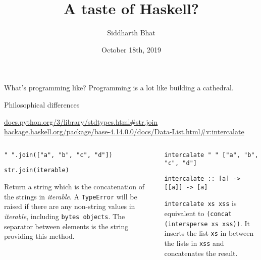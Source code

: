 \documentclass[8pt]{beamer}
\author{Siddharth Bhat}
\date{October 18th, 2019}
\institute{IIIT Open Source Developers group}
\title{A taste of Haskell?}
\begin{document}
\maketitle

\begin{frame}[fragile]{What's programming like?}
    Programming is a lot like building a cathedral.
\end{frame}

\begin{frame}[fragile]{Philosophical differences}

{\tiny \url{docs.python.org/3/library/stdtypes.html#str.join}}
{\tiny \url{hackage.haskell.org/package/base-4.14.0.0/docs/Data-List.html#v:intercalate}}

\begin{columns}%
\begin{column}{.48\textwidth}
\begin{verbatim}
" ".join(["a", "b", "c", "d"])
\end{verbatim}
\begin{verbatim}
str.join(iterable)
\end{verbatim}

Return a string which is the concatenation of the strings in \emph{iterable}. A
\verb|TypeError| will be raised if there are any non-string values in \emph{iterable},
including \verb|bytes objects|. The separator between elements is the string providing
this method.


\end{column}
%
\begin{column}{.48\textwidth}
\begin{verbatim}
intercalate " " ["a", "b", "c", "d"]
\end{verbatim}

\begin{verbatim}
intercalate :: [a] -> [[a]] -> [a]
\end{verbatim}

\verb|intercalate xs xss| is equivalent to \verb|(concat (intersperse xs xss))|.
It inserts the list \verb|xs| in between the lists in \verb|xss| and concatenates the result.

\end{column}
\end{columns}

\end{frame}
\end{document}
